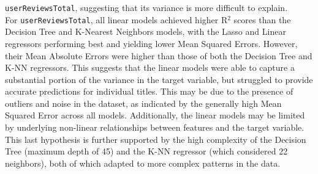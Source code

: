 \texttt{userReviewsTotal}, suggesting that its variance is more difficult to explain.\\
For \texttt{userReviewsTotal}, all linear models achieved higher R$^2$ scores than the Decision Tree and
K-Nearest Neighbors models, with the Lasso and Linear regressors performing best and yielding lower Mean Squared
Errors. However, their Mean Absolute Errors were higher than those of both the Decision Tree and K-NN regressors.
This suggests that the linear models were able to capture a substantial portion of the variance in the target variable,
but struggled to provide accurate predictions for individual titles. This may be due to the presence of outliers and
noise in the dataset, as indicated by the generally high Mean Squared Error across all models.
Additionally, the linear models may be limited by underlying non-linear relationships between features and the target variable.
This last hypothesis is further supported by the high complexity of the Decision Tree (maximum depth of 45) and the K-NN regressor
(which considered 22 neighbors), both of which adapted to more complex patterns in the data.
